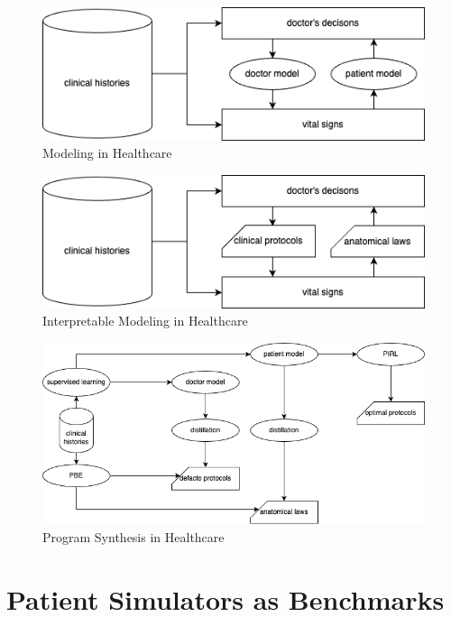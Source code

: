 \begin{figure}
    \centering
    \includegraphics[width=0.8\linewidth]{images/PatientModeling.drawio.png}
    \caption{Modeling in Healthcare}
    \label{fig:modelhealth}
\end{figure}

\begin{figure}
    \centering
    \includegraphics[width=0.8\linewidth]{images/PatientModelingInter.drawio.png}
    \caption{Interpretable Modeling in Healthcare}
    \label{fig:modelhealthinter}
\end{figure}

\begin{figure}
    \centering
    \includegraphics[width=\linewidth]{images/PSHealth.drawio.png}
    \caption{Program Synthesis in Healthcare}
    \label{fig:pshealth}
\end{figure}




\newpage
\section{Patient Simulators as Benchmarks}

